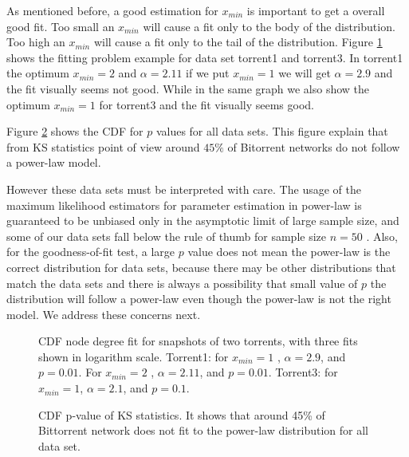 \documentclass[10pt,conference,letterpaper]{IEEEtran}
\begin{document}
As mentioned before, a good estimation for $x_{min}$ is important to get a overall good fit.
Too small an $x_{min}$ will cause a fit only to the body of the distribution.
Too high an $x_{min}$ will cause a fit only to the tail of the distribution.
Figure \ref{fig:fitting} shows the fitting problem example for data set torrent1 and torrent3.
In torrent1 the optimum $x_{min}=2$ and $\alpha=2.11$ if we put $x_{min}=1$ we will get $\alpha=2.9$ and the fit visually seems not good.
While in the same graph we also show the optimum $x_{min}=1$ for torrent3 and the fit visually seems good.

Figure  \ref{fig:cdf-p} shows the CDF for $p$ values for all data sets. 
This figure explain that from KS statistics point of view around $45\%$ of Bitorrent networks do not follow a power-law model.

However these data sets must be interpreted with care. 
The usage of the maximum likelihood estimators for parameter estimation in power-law is guaranteed to be unbiased only in the asymptotic limit of large sample size, and some of our data sets fall below the rule of thumb for sample size $n=50$ \cite{clauset2009power}. 
Also, for the goodness-of-fit test, a large $p$ value does not mean the power-law  is the correct distribution for data sets, because there may be other distributions that match the data sets and there is always a possibility that small value of $p$ the distribution will follow a power-law even though the power-law is not the right model\cite{clauset2009power}. 
We address these concerns next.

\begin{figure}
\centering
{}
\caption{CDF node degree fit for snapshots of two torrents, with three fits shown in logarithm scale. Torrent1: for $x_{min}=1$ , $\alpha = 2.9$, and $p=0.01$. For $x_{min}=2$ , $\alpha = 2.11$, and $p = 0.01$. Torrent3: for $x_{min}=1$, $\alpha = 2.1$, and $p = 0.1$. }
\label{fig:fitting}
\vspace{-5mm}
\end{figure}

\begin{figure}
\centering
\caption{CDF p-value of KS statistics. It shows that around 45\% of Bittorrent network does not fit to the power-law distribution for all data set.} 
\label{fig:cdf-p}
\vspace{-5mm}
\end{figure}
\end{document}
